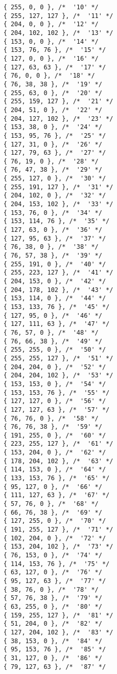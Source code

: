 \documentclass[onesize, a4paper]{refart}
\begin{document}
\begin{verbatim}
    { 255, 0, 0 }, /*  '10' */
    { 255, 127, 127 }, /*  '11' */
    { 204, 0, 0 }, /*  '12' */
    { 204, 102, 102 }, /*  '13' */
    { 153, 0, 0 }, /*  '14' */
    { 153, 76, 76 }, /*  '15' */
    { 127, 0, 0 }, /*  '16' */
    { 127, 63, 63 }, /*  '17' */
    { 76, 0, 0 }, /*  '18' */
    { 76, 38, 38 }, /*  '19' */
    { 255, 63, 0 }, /*  '20' */
    { 255, 159, 127 }, /*  '21' */
    { 204, 51, 0 }, /*  '22' */
    { 204, 127, 102 }, /*  '23' */
    { 153, 38, 0 }, /*  '24' */
    { 153, 95, 76 }, /*  '25' */
    { 127, 31, 0 }, /*  '26' */
    { 127, 79, 63 }, /*  '27' */
    { 76, 19, 0 }, /*  '28' */
    { 76, 47, 38 }, /*  '29' */
    { 255, 127, 0 }, /*  '30' */
    { 255, 191, 127 }, /*  '31' */
    { 204, 102, 0 }, /*  '32' */
    { 204, 153, 102 }, /*  '33' */
    { 153, 76, 0 }, /*  '34' */
    { 153, 114, 76 }, /*  '35' */
    { 127, 63, 0 }, /*  '36' */
    { 127, 95, 63 }, /*  '37' */
    { 76, 38, 0 }, /*  '38' */
    { 76, 57, 38 }, /*  '39' */
    { 255, 191, 0 }, /*  '40' */
    { 255, 223, 127 }, /*  '41' */
    { 204, 153, 0 }, /*  '42' */
    { 204, 178, 102 }, /*  '43' */
    { 153, 114, 0 }, /*  '44' */
    { 153, 133, 76 }, /*  '45' */
    { 127, 95, 0 }, /*  '46' */
    { 127, 111, 63 }, /*  '47' */
    { 76, 57, 0 }, /*  '48' */
    { 76, 66, 38 }, /*  '49' */
    { 255, 255, 0 }, /*  '50' */
    { 255, 255, 127 }, /*  '51' */
    { 204, 204, 0 }, /*  '52' */
    { 204, 204, 102 }, /*  '53' */
    { 153, 153, 0 }, /*  '54' */
    { 153, 153, 76 }, /*  '55' */
    { 127, 127, 0 }, /*  '56' */
    { 127, 127, 63 }, /*  '57' */
    { 76, 76, 0 }, /*  '58' */
    { 76, 76, 38 }, /*  '59' */
    { 191, 255, 0 }, /*  '60' */
    { 223, 255, 127 }, /*  '61' */
    { 153, 204, 0 }, /*  '62' */
    { 178, 204, 102 }, /*  '63' */
    { 114, 153, 0 }, /*  '64' */
    { 133, 153, 76 }, /*  '65' */
    { 95, 127, 0 }, /*  '66' */
    { 111, 127, 63 }, /*  '67' */
    { 57, 76, 0 }, /*  '68' */
    { 66, 76, 38 }, /*  '69' */
    { 127, 255, 0 }, /*  '70' */
    { 191, 255, 127 }, /*  '71' */
    { 102, 204, 0 }, /*  '72' */
    { 153, 204, 102 }, /*  '73' */
    { 76, 153, 0 }, /*  '74' */
    { 114, 153, 76 }, /*  '75' */
    { 63, 127, 0 }, /*  '76' */
    { 95, 127, 63 }, /*  '77' */
    { 38, 76, 0 }, /*  '78' */
    { 57, 76, 38 }, /*  '79' */
    { 63, 255, 0 }, /*  '80' */
    { 159, 255, 127 }, /*  '81' */
    { 51, 204, 0 }, /*  '82' */
    { 127, 204, 102 }, /*  '83' */
    { 38, 153, 0 }, /*  '84' */
    { 95, 153, 76 }, /*  '85' */
    { 31, 127, 0 }, /*  '86' */
    { 79, 127, 63 }, /*  '87' */

\end{verbatim}
\end{document}
